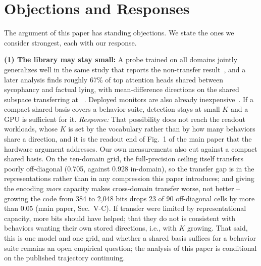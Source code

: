 \section{Objections and Responses}
\label{sec:RedTeam}

The argument of this paper has standing objections. We state the ones
we consider strongest, each with our response.

\textbf{(1) The library may stay small:} A probe trained on all
domains jointly generalizes well in the same study that reports the
non-transfer result~\cite{ying2026spectrum}, and a later analysis
finds roughly 67\% of top attention heads shared between sycophancy
and factual lying, with mean-difference directions on the shared
subspace transferring at ~\cite{pandey2026shared}. Deployed
monitors are also already
inexpensive~\cite{anthropic2025cheapmonitors}. If a compact shared
basis covers a behavior suite, detection stays at small $K$ and a GPU
is sufficient for it. \emph{Response:} That possibility does not reach
the readout workloads, whose $K$ is set by the vocabulary rather than
by how many behaviors share a direction, and it is the readout end of
Fig.~1 of the main paper that the hardware argument addresses. Our own
measurements also cut against a compact shared basis. On the
ten-domain grid, the full-precision ceiling itself transfers poorly
off-diagonal (0.705, against 0.928 in-domain), so the transfer gap is
in the representations rather than in any compression this paper
introduces; and giving the encoding \emph{more} capacity makes
cross-domain transfer worse, not better -- growing the code from 384
to 2{,}048 bits drops 23 of 90 off-diagonal cells by more than 0.05
\auroc (main paper, Sec.~V-C). If transfer were limited by
representational capacity, more bits should have helped; that they do
not is consistent with behaviors wanting their own stored directions,
i.e., with $K$ growing. That said, this is one model and one grid,
and whether a shared basis suffices for a behavior suite remains an
open empirical question; the analysis of this paper is conditional on
the published trajectory continuing.

